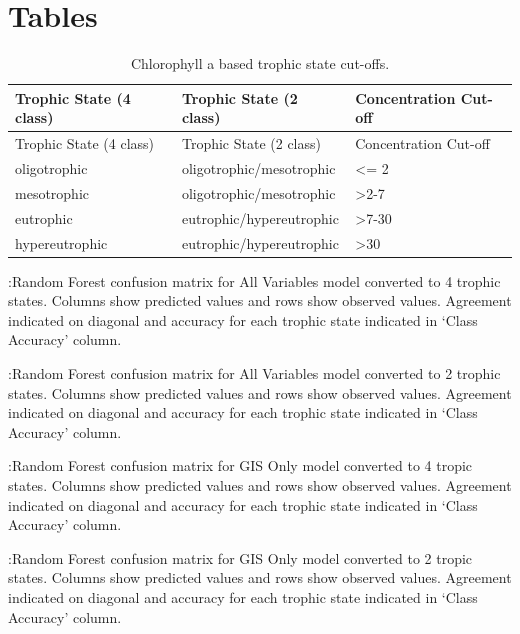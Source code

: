 \documentclass[11pt,]{article}
\begin{document}
\newpage

\newpage

\newpage

\newpage

\newpage

\section{Tables}\label{tables}

\begin{longtable}[c]{@{}lll@{}}
\caption{Chlorophyll a based trophic state cut-offs.
\label{tab:trophicStateTable}}\tabularnewline
\toprule
Trophic State (4 class) & Trophic State (2 class) & Concentration
Cut-off\tabularnewline
\midrule
\endfirsthead
\toprule
Trophic State (4 class) & Trophic State (2 class) & Concentration
Cut-off\tabularnewline
\midrule
\endhead
oligotrophic & oligotrophic/mesotrophic & \textless{}= 2\tabularnewline
mesotrophic & oligotrophic/mesotrophic &
\textgreater{}2-7\tabularnewline
eutrophic & eutrophic/hypereutrophic & \textgreater{}7-30\tabularnewline
hypereutrophic & eutrophic/hypereutrophic &
\textgreater{}30\tabularnewline
\bottomrule
\end{longtable}

\newpage

:Random Forest confusion matrix for All Variables model converted to 4
trophic states. Columns show predicted values and rows show observed
values. Agreement indicated on diagonal and accuracy for each trophic
state indicated in `Class Accuracy' column. \label{tab:Confusion_All_4}

\newpage

:Random Forest confusion matrix for All Variables model converted to 2
trophic states. Columns show predicted values and rows show observed
values. Agreement indicated on diagonal and accuracy for each trophic
state indicated in `Class Accuracy' column. \label{tab:Confusion_All_2}

\newpage

:Random Forest confusion matrix for GIS Only model converted to 4 tropic
states. Columns show predicted values and rows show observed values.
Agreement indicated on diagonal and accuracy for each trophic state
indicated in `Class Accuracy' column. \label{tab:Confusion_GIS_4}

\newpage

:Random Forest confusion matrix for GIS Only model converted to 2 tropic
states. Columns show predicted values and rows show observed values.
Agreement indicated on diagonal and accuracy for each trophic state
indicated in `Class Accuracy' column. \label{tab:Confusion_GIS_2}
\newpage
\end{document}
